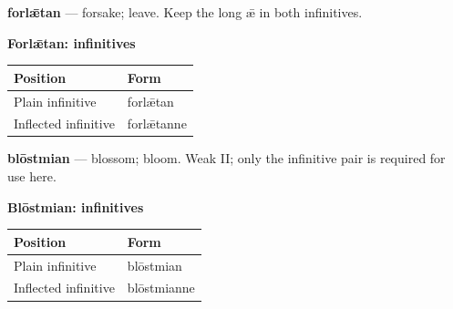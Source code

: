 \par\begin{minipage}{\linewidth}\raggedright
\textbf{forlǣtan} — forsake; leave. Keep the long ǣ in both infinitives.

\textbf{Forlǣtan: infinitives}

\par\begingroup
\fontsize{10.5}{13.2}\selectfont
\setlength{\LTleft}{0pt}\setlength{\LTright}{\fill}
\noindent
\begin{tabular}{@{}>{\raggedright\arraybackslash}p{71.72mm}>{\raggedright\arraybackslash}p{49.46mm}@{}}
\toprule
\textbf{Position} & \textbf{Form} \\
\midrule
Plain infinitive & forlǣtan \\
Inflected infinitive & forlǣtanne \\
\bottomrule
\end{tabular}
\par\endgroup

\end{minipage}\par\addvspace{4pt}
\textbf{blōstmian} — blossom; bloom. Weak II; only the infinitive pair is required for use here.

\textbf{Blōstmian: infinitives}

\par\begingroup
\fontsize{10.5}{13.2}\selectfont
\setlength{\LTleft}{0pt}\setlength{\LTright}{\fill}
\noindent
\begin{tabular}{@{}>{\raggedright\arraybackslash}p{68.91mm}>{\raggedright\arraybackslash}p{52.28mm}@{}}
\toprule
\textbf{Position} & \textbf{Form} \\
\midrule
Plain infinitive & blōstmian \\
Inflected infinitive & blōstmianne \\
\bottomrule
\end{tabular}
\par\endgroup

